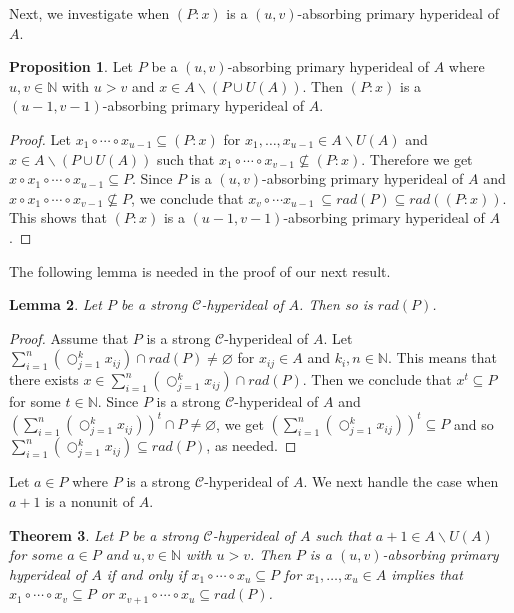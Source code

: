 \documentclass[preprint,review,10pt]{amsart}
\newtheorem{theorem}{Theorem}[section]
\newtheorem{lemma}[theorem]{Lemma}
\theoremstyle{definition}
\newtheorem{proposition}[theorem]{Proposition}
\theoremstyle{remark}
\numberwithin{equation}{section}
\begin{document}
Next, we investigate when $(P:x)$ is a $(u,v)$-absorbing primary hyperideal of $A$. 
\begin{proposition} \label{3}
Let $P$ be a $(u,v)$-absorbing primary hyperideal of $A$ where $u,v \in \mathbb{N}$ with $u >v$ and $x \in A \backslash (P \cup U(A))$. Then $(P : x)$ is a $(u-1,v-1)$-absorbing primary hyperideal of $A$. 
\end{proposition}
\begin{proof}
Let $x_1 \circ \cdots \circ x_{u-1} \subseteq (P : x)$ for $x_1, \ldots, x_{u-1} \in A \backslash U(A)$ and $x \in A \backslash (P \cup U(A))$ such that $x_1 \circ \cdots \circ x_{v-1} \nsubseteq (P : x)$. Therefore we get $x \circ x_1 \circ \cdots \circ x_{u-1} \subseteq P$. Since $P$ is a $(u,v)$-absorbing primary hyperideal of $A$ and $x \circ x_1 \circ \cdots \circ x_{v-1} \nsubseteq P$, we conclude that $x_v \circ \cdots x_{u-1} \ \subseteq rad(P) \subseteq rad((P : x))$. This shows that $(P : x)$ is a $(u-1,v-1)$-absorbing primary hyperideal of $A$. 
\end{proof}
The following lemma is needed in the proof of our next result.
\begin{lemma} \label{4}
Let $P$ be a strong $\mathcal{C}$-hyperideal of $A$. Then so is $rad(P)$. 
\end{lemma}
\begin{proof}
Assume that $P$ is a strong $\mathcal{C}$-hyperideal of $A$. Let $\sum_{i=1}^n(\bigcirc_{j=1}^k x_{ij}) \cap rad(P) \neq \varnothing$ for $x_{ij} \in A$ and  $k_i, n \in  \mathbb{N}$. This means that there exists $x \in \sum_{i=1}^n(\bigcirc_{j=1}^k x_{ij}) \cap rad(P)$. Then we conclude  that $x^t \subseteq P$ for some $t \in \mathbb{N}$. Since $P$ is a strong $\mathcal{C}$-hyperideal of $A$ and $(\sum_{i=1}^n(\bigcirc_{j=1}^k x_{ij}))^t \cap P \neq \varnothing$, we get $(\sum_{i=1}^n(\bigcirc_{j=1}^k x_{ij}))^t \subseteq P$ and so $\sum_{i=1}^n(\bigcirc_{j=1}^k x_{ij}) \subseteq rad(P)$, as needed.
\end{proof}
Let $a \in P$ where $P$ is a strong $\mathcal{C}$-hyperideal of $A$. We next handle the case when $a+1$ is a nonunit of $A$.
\begin{theorem} \label{5}
Let $P$ be a strong $\mathcal{C}$-hyperideal of $A$ such that $a+1 \in A \backslash U(A)$ for some $a \in P$ and  $u,v \in \mathbb{N}$ with $u >v$. Then $P$ is a $(u,v)$-absorbing primary  hyperideal of $A$ if and only if  $x_1 \circ \cdots \circ x_u \subseteq P$ for $x_1,\ldots, x_u \in A $ implies that $x_1 \circ \cdots \circ x_v \subseteq P$ or $x_{v+1} \circ \cdots \circ x_u \subseteq rad(P)$.
\end{theorem}
\end{document}
